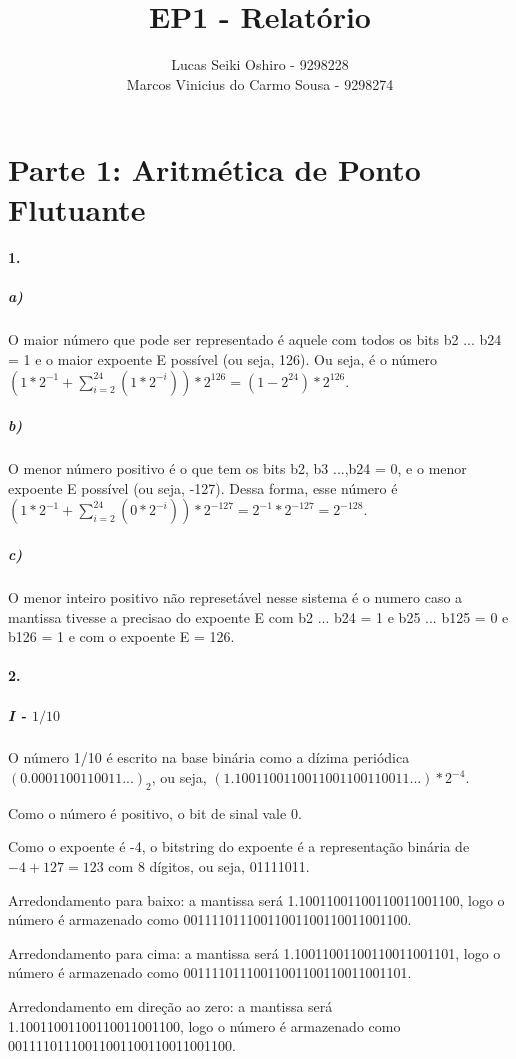 \documentclass{article}
\title{EP1 - Relatório}
\author{Lucas Seiki Oshiro - 9298228\\ Marcos Vinicius do Carmo Sousa    - 9298274}
\begin{document}
\maketitle
\section{ Parte 1: Aritmética de Ponto Flutuante}
\paragraph*{1.}
\subparagraph{a)}
O maior número que pode ser representado é aquele com todos os bits b2 ... b24 = 1 e o maior expoente E possível (ou seja, 126). Ou seja, é o número $(1 * 2^{-1} + \sum_{i = 2}^{24} (1 * 2^{-i})) * 2^{126} = (1 - 2^{24}) * 2^{126}$.

\subparagraph{b)}
O menor número positivo é o que tem os bits b2, b3 ...,b24 = 0, e o menor expoente E possível (ou seja, -127). Dessa forma, esse número é $(1 * 2^{-1} + \sum_{i = 2}^{24} (0 * 2^{-i})) * 2^{-127} = 2^{-1} * 2^{-127} = 2^{-128}$.

\subparagraph{c)}
O menor inteiro positivo não represetável nesse sistema é o numero caso a mantissa tivesse a precisao do expoente E com b2 ... b24 = 1 e b25 ... b125 = 0 e b126 = 1 e com o expoente E = 126.


\paragraph*{2.}
\subparagraph{I - $1/10$}

 O número 1/10 é escrito na base binária como a dízima periódica $(0.0001100110011...)_{2}$, ou seja, $(1.1001100110011001100110011...) * 2^{-4}$.
 
 Como o número é positivo, o bit de sinal vale 0.
 
 Como o expoente é -4, o bitstring do expoente é a representação binária de $-4 + 127 = 123$ com 8 dígitos, ou seja, 01111011.
 
 Arredondamento para baixo: a mantissa será 1.10011001100110011001100, logo o número é armazenado como 00111101110011001100110011001100.
 
 Arredondamento para cima: a mantissa será 1.10011001100110011001101, logo o número é armazenado como 00111101110011001100110011001101.
 
 Arredondamento em direção ao zero: a mantissa será 1.10011001100110011001100, logo o número é armazenado como 00111101110011001100110011001100.
 
\end{document}
